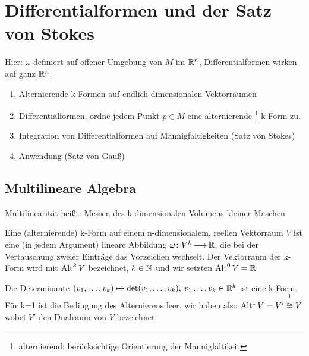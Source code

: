 \documentclass[skript.tex]{subfiles}
\begin{document}
\setcounter{cntr}{0}
	\chapter{Differentialformen und der Satz von Stokes}
	
	Hier: $\omega$ definiert auf offener Umgebung von $M$ im ${\mathbb{R}^n}$, Differentialformen wirken auf ganz ${\mathbb{R}^n}$.
	
	\begin{enumerate}
		\item Alternierende k-Formen auf endlich-dimensionalen Vektorräumen
		\item Differentialformen, ordne jedem Punkt $ p \in M$ eine alternierende \footnote{alternierend: berücksichtige Orientierung der Mannigfaltikeit} k-Form zu.
		\item Integration von Differentialformen auf Mannigfaltigkeiten (Satz von Stokes)
		\item Anwendung (Satz von Gauß)
	\end{enumerate}
	
	\section{Multilineare Algebra}
	
	Multilinearität heißt: Messen des k-dimensionalen Volumens kleiner Maschen
	
	\begin{defin}[k-Formen] 
		Eine (alternierende) k-Form auf einem n-dimensionalem, reellen Vektorraum $V$ ist eine (in jedem Argument) lineare Abbildung $\omega \colon V^k \kern -1pt \longrightarrow \kern -1pt \mathbb{R}$, die bei der Vertauschung zweier Einträge das Vorzeichen wechselt. Der Vektorraum der k-Form wird mit $\operatorname{Alt} ^k V$ bezeichnet, $k \in \mathbb{N}$ und wir setzten $\operatorname{Alt}^0 V = \mathbb{R}$
	\end{defin}

	\begin{bsp}
		Die Determinante $(v_1, \dots, v_k) \mapsto \det(v_1, \dots, v_k), \: v_1 \dots, v_k \in \mathbb{R}^k$ ist eine k-Form. Für k=1 ist die Bedingung des Alternierens leer, wir haben also $\alt^1 V = V'\overset{\footnotemark}{\cong}  V$  wobei $V'$ den Dualraum von $V$ bezeichnet.
	\end{bsp}
\end{document}
